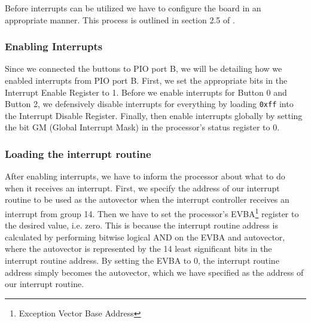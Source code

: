 Before interrupts can be utilized we have to configure the board in an appropriate manner. This process is outlined in section 2.5 of \cite{lab-compendium}.
\subsubsection{Enabling Interrupts}
Since we connected the buttons to PIO port B, we will be detailing how we enabled interrupts from PIO port B.
First, we set the appropriate bits in the Interrupt Enable Register to 1.
Before we enable interrupts for Button 0 and Button 2, we defensively disable interrupts for everything by loading \texttt{0xff} into the Interrupt Disable Register.
Finally, then enable interrupts globally by setting the bit GM (Global Interrupt Mask) in the processor's status register to 0. %
\subsubsection{Loading the interrupt routine}
After enabling interrupts, we have to inform the processor about what to do when it receives an interrupt.
First, we specify the address of our interrupt routine to be used as the autovector when the interrupt controller receives an interrupt from group 14.
Then we have to set the processor's EVBA\footnote{Exception Vector Base Address} register to the desired value, i.e. zero.
This is because the interrupt routine address is calculated by performing bitwise logical AND on the EVBA and autovector, where the autovector is represented by the 14 least significant bits in the interrupt routine address.
By setting the EVBA to 0, the interrupt routine address simply becomes the autovector, which we have specified as the address of our interrupt routine.

